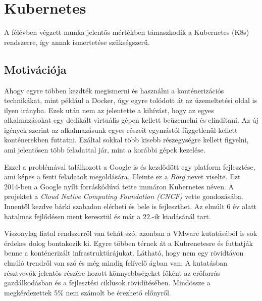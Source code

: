\chapter{Kubernetes}
\label{sec:Kubernetes}
A félévben végzett munka jelentős mértékben támaszkodik a Kubernetes (K8s) rendszerre, így annak ismertetése szükségszerű. 

\section{Motivációja}
Ahogy egyre többen kezdték megismerni és használni a konténerizációs technikákat, mint például a Docker, úgy egyre tolódott át az üzemeltetési oldal is ilyen irányba. Ezek után nem  az jelentette a kihívást, hogy az egyes alkalmazásokat egy dedikált virtuális gépen kellett beüzemelni és elindítani. Az új igények szerint az alkalmazásunk egyes részeit egymástól függetlenül kellett konténerekben futtatni. Ezáltal sokkal több kisebb részegységre kellett figyelni, ami jelentősen több feladattal jár, mint a korábbi gépek kezelése. 

Ezzel a problémával találkozott a Google is és kezdődött egy platform fejlesztése, ami képes a fenti feladatok megoldására. Eleinte ez a \textit{Borg}\citep{Borg} nevet viselte. Ezt 2014-ben a Google nyílt forráskódúvá tette immáron Kubernetes néven. A projektet a \textit{Cloud Native Computing Foundation (CNCF)} vette gondozásába. Innentől kezdve bárki szabadon elérheti és bele is fejleszthet. Az elmúlt 6 év alatt hatalmas fejlődésen ment keresztül és már a $22$.-ik kiadásánál tart.

Viszonylag fiatal rendszerről van tehát szó, azonban a VMware kutatásából\citep{VMwareSurvey} is sok érdekes dolog bontakozik ki. Egyre többen térnek át a Kubrenetesre és futtatják benne a konténerizált infrastruktúrájukat. Látható, hogy nem egy rövidtávon elmúló trendről van szó és még mindig felívelő ágban van. A kutatásban résztvevők jelentős részére hozott könnyebbségeket főként az erőforrás gazdálkodásban és a fejlesztési ciklusok rövidítésében. Mindössze a megkérdezettek 5\% nem számolt be érezhető előnyről.  

